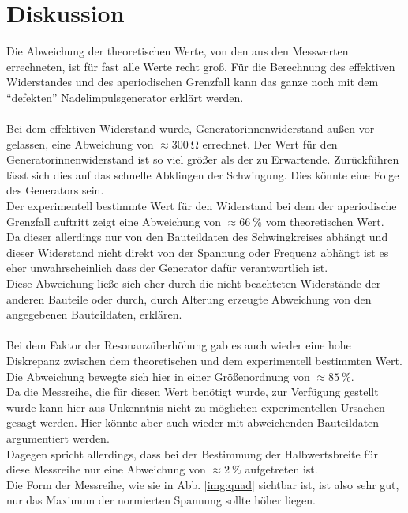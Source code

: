 \section{Diskussion}
Die Abweichung der theoretischen Werte, von den aus den Messwerten errechneten, ist für fast alle Werte recht groß.
Für die Berechnung des effektiven Widerstandes und des aperiodischen Grenzfall kann
das ganze noch mit dem \enquote{defekten} Nadelimpulsgenerator erklärt werden.\\\\
\noindent
Bei dem effektiven Widerstand wurde, Generatorinnenwiderstand außen vor gelassen, eine Abweichung von $\approx \SI{300}{\ohm}$ errechnet.
Der Wert für den Generatorinnenwiderstand ist so viel größer als der zu Erwartende. Zurückführen lässt sich dies auf das schnelle Abklingen der Schwingung.
Dies könnte eine Folge des Generators sein.\\
Der experimentell bestimmte Wert für den Widerstand bei dem der aperiodische Grenzfall auftritt
zeigt eine Abweichung von $\approx \SI{66}{\percent}$ vom theoretischen Wert.\\
Da dieser allerdings nur von den Bauteildaten des Schwingkreises abhängt und 
dieser Widerstand nicht direkt von der Spannung oder Frequenz abhängt ist es eher unwahrscheinlich
dass der Generator dafür verantwortlich ist.\\
Diese Abweichung ließe sich eher durch die nicht beachteten Widerstände der anderen Bauteile oder durch, durch Alterung erzeugte Abweichung von den angegebenen Bauteildaten, erklären.\\\\
\noindent
Bei dem Faktor der Resonanzüberhöhung gab es auch wieder eine hohe Diskrepanz zwischen dem theoretischen und dem experimentell bestimmten Wert.
Die Abweichung bewegte sich hier in einer Größenordnung von  $\approx \SI{85}{\percent}$.\\
Da die Messreihe, die für diesen Wert benötigt wurde, zur Verfügung gestellt wurde kann hier aus Unkenntnis nicht zu möglichen experimentellen Ursachen gesagt werden.
Hier könnte aber auch wieder mit abweichenden Bauteildaten argumentiert werden.\\
Dagegen spricht allerdings, dass bei der Bestimmung der Halbwertsbreite für diese Messreihe nur eine Abweichung von $\approx \SI{2}{\percent}$ aufgetreten ist.\\
Die Form der Messreihe, wie sie in Abb. \ref{img:quad} sichtbar ist, ist also sehr gut, nur das Maximum der normierten Spannung sollte höher liegen.\\\\
